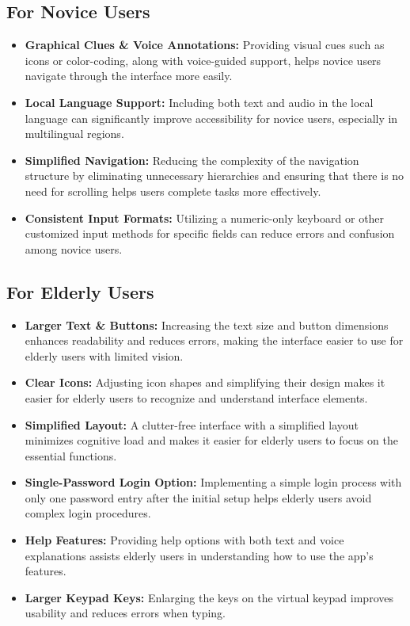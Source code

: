 \documentclass[a4paper,12pt]{report}
\begin{document}
\subsection*{For Novice Users}
\begin{itemize}
  \item \textbf{Graphical Clues \& Voice Annotations:} Providing visual cues such as icons or color-coding, along with voice-guided support, helps novice users navigate through the interface more easily.
  \item \textbf{Local Language Support:} Including both text and audio in the local language can significantly improve accessibility for novice users, especially in multilingual regions.
  \item \textbf{Simplified Navigation:} Reducing the complexity of the navigation structure by eliminating unnecessary hierarchies and ensuring that there is no need for scrolling helps users complete tasks more effectively.
  \item \textbf{Consistent Input Formats:} Utilizing a numeric-only keyboard or other customized input methods for specific fields can reduce errors and confusion among novice users.
\end{itemize}

\subsection*{For Elderly Users}
\begin{itemize}
  \item \textbf{Larger Text \& Buttons:} Increasing the text size and button dimensions enhances readability and reduces errors, making the interface easier to use for elderly users with limited vision.
  \item \textbf{Clear Icons:} Adjusting icon shapes and simplifying their design makes it easier for elderly users to recognize and understand interface elements.
  \item \textbf{Simplified Layout:} A clutter-free interface with a simplified layout minimizes cognitive load and makes it easier for elderly users to focus on the essential functions.
  \item \textbf{Single-Password Login Option:} Implementing a simple login process with only one password entry after the initial setup helps elderly users avoid complex login procedures.
  \item \textbf{Help Features:} Providing help options with both text and voice explanations assists elderly users in understanding how to use the app's features.
  \item \textbf{Larger Keypad Keys:} Enlarging the keys on the virtual keypad improves usability and reduces errors when typing.
\end{itemize}
\end{document}
